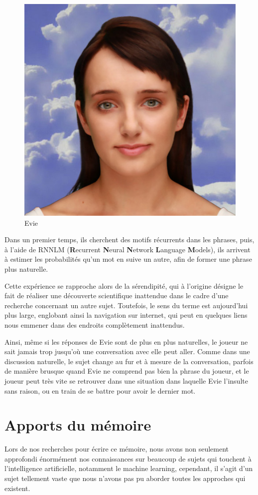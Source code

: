 \documentclass[a4paper, 12pt]{article} %
\begin{document}
\begin{figure}[!h]%
	\begin{center} 
		\includegraphics[width=0.40\columnwidth]{images/evie.png}%
		\caption{Evie}%
	\end{center}
\end{figure}

Dans un premier temps, ils cherchent  des motifs récurrents dans les phrases, puis, à l’aide de RNNLM (\textbf{R}ecurrent \textbf{N}eural \textbf{N}etwork \textbf{L}anguage \textbf{M}odels), ils arrivent à  estimer les probabilités qu'un mot en suive un autre, afin de former une phrase plus naturelle.

Cette expérience se rapproche alors de la sérendipité, qui à l'origine désigne le fait de réaliser une découverte scientifique inattendue dans le cadre d'une recherche concernant un autre sujet. Toutefois, le sens du terme est aujourd'hui plus large, englobant ainsi la navigation sur internet, qui peut en quelques liens nous emmener dans des endroits complètement inattendus.

Ainsi, même si les réponses de Evie sont de plus en plus naturelles, le joueur ne sait jamais trop jusqu'où une conversation avec elle peut aller. Comme dans une discussion naturelle, le sujet change au fur et à mesure de la conversation, parfois de manière brusque quand Evie ne comprend pas bien la phrase du joueur, et le joueur peut très vite se retrouver dans une situation dans laquelle Evie l'insulte sans raison, ou en train de se battre pour avoir le dernier mot.


\newpage
\section{Apports du mémoire}

Lors de nos recherches pour écrire ce mémoire, nous avons non seulement approfondi énormément nos connaissances sur beaucoup de sujets qui touchent à l'intelligence artificielle, notamment le machine learning, cependant, il s'agit d'un sujet tellement vaste que nous n'avons pas pu aborder toutes les approches qui existent.
\end{document}
